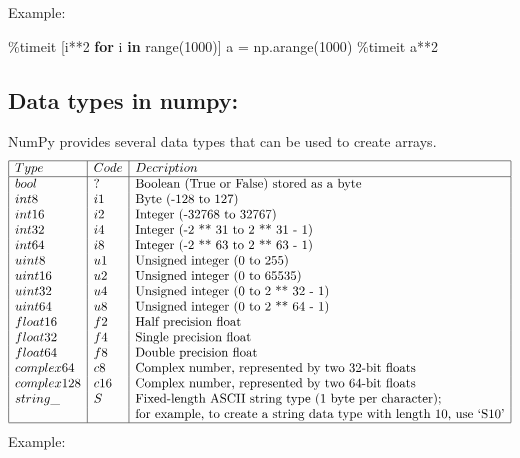 \documentclass[11pt]{article}
\newenvironment{Shaded}{}{}
\newcommand{\KeywordTok}[1]{\textcolor[rgb]{0.00,0.44,0.13}{\textbf{{#1}}}}
\newcommand{\DecValTok}[1]{\textcolor[rgb]{0.25,0.63,0.44}{{#1}}}
\newcommand{\NormalTok}[1]{{#1}}
\newcommand{\ControlFlowTok}[1]{\textcolor[rgb]{0.00,0.44,0.13}{\textbf{{#1}}}}
\newcommand{\OperatorTok}[1]{\textcolor[rgb]{0.40,0.40,0.40}{{#1}}}
\newcommand{\BuiltInTok}[1]{{#1}}
\begin{document}
Example:

\begin{Shaded}
\begin{Highlighting}[]
\OperatorTok{\%}\NormalTok{timeit [i}\OperatorTok{**}\DecValTok{2} \ControlFlowTok{for}\NormalTok{ i }\KeywordTok{in} \BuiltInTok{range}\NormalTok{(}\DecValTok{1000}\NormalTok{)]}
\NormalTok{a }\OperatorTok{=}\NormalTok{ np.arange(}\DecValTok{1000}\NormalTok{)}
\OperatorTok{\%}\NormalTok{timeit a}\OperatorTok{**}\DecValTok{2}
\end{Highlighting}
\end{Shaded}

\hypertarget{data-types-in-numpy}{%
\subsection{Data types in numpy:}\label{data-types-in-numpy}}

NumPy provides several data types that can be used to create arrays.
$$
\begin{array}{|l|l|l|}
  \hline
Type&Code& Decription\\
\hline
bool &    ? & \text{Boolean (True or False) stored as a byte} \\
int8 &    i1 & \text{Byte (-128 to 127)} \\
int16 &   i2 & \text{Integer (-32768 to 32767)} \\
int32 &   i4 & \text{Integer (-2 ** 31 to 2 ** 31 - 1)} \\
int64 &   i8 & \text{Integer (-2 ** 63 to 2 ** 63 - 1)} \\
uint8 &   u1 & \text{Unsigned integer (0 to 255)} \\
uint16 &  u2 & \text{Unsigned integer (0 to 65535)} \\
uint32 &  u4 & \text{Unsigned integer (0 to 2 ** 32 - 1)} \\
uint64 &  u8 & \text{Unsigned integer (0 to 2 ** 64 - 1)} \\
float16 & f2 & \text{Half precision float} \\
float32 & f4 & \text{Single precision float} \\
float64 & f8 & \text{Double precision float} \\
complex64 & c8 & \text{Complex number, represented by two 32-bit floats} \\
complex128 & c16 & \text{Complex number, represented by two 64-bit floats} \\
string\_& S & \text{Fixed-length ASCII string type (1 byte per character);}\\
&& \text{for example, to create a string data type with length 10, use `S10'} \\
\hline
\end{array}
$$
Example:
\end{document}

